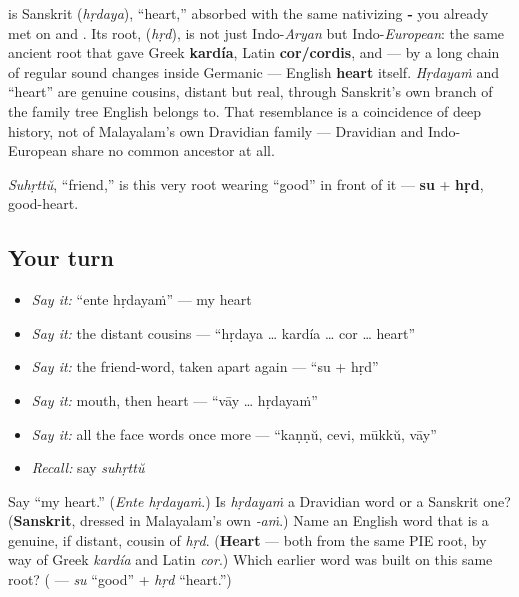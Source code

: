 \begin{cousinweb}
\textbf{} is Sanskrit \textbf{} (\emph{hṛdaya}), \textquotedblleft{}heart,\textquotedblright{} absorbed with the same nativizing \textbf{‑} you already met on \textbf{} and \textbf{}. Its root, \textbf{} (\emph{hṛd}), is not just Indo-\emph{Aryan} but Indo-\emph{European}: the same ancient root that gave Greek \textbf{kardía}, Latin \textbf{cor/cordis}, and — by a long chain of regular sound changes inside Germanic — English \textbf{heart} itself. \emph{Hṛdayaṁ} and \textquotedblleft{}heart\textquotedblright{} are genuine cousins, distant but real, through Sanskrit's own branch of the family tree English belongs to. That resemblance is a coincidence of deep history, not of Malayalam's own Dravidian family — Dravidian and Indo-European share no common ancestor at all.

\emph{Suhṛttŭ}, \textquotedblleft{}friend,\textquotedblright{} is this very root wearing \textquotedblleft{}good\textquotedblright{} in front of it — \textbf{su} + \textbf{hṛd}, good-heart.
\end{cousinweb}

\subsection*{Your turn}
\begin{itemize}
\raggedright
  \item \emph{Say it:} \textquotedblleft{}ente hṛdayaṁ\textquotedblright{} — my heart
  \item \emph{Say it:} the distant cousins — \textquotedblleft{}hṛdaya … kardía … cor … heart\textquotedblright{}
  \item \emph{Say it:} the friend-word, taken apart again — \textquotedblleft{}su + hṛd\textquotedblright{}
  \item \emph{Say it:} mouth, then heart — \textquotedblleft{}vāy … hṛdayaṁ\textquotedblright{}
  \item \emph{Say it:} all the face words once more — \textquotedblleft{}kaṇṇŭ, cevi, mūkkŭ, vāy\textquotedblright{}
  \item \emph{Recall:} say \emph{suhṛttŭ}
\end{itemize}

\begin{tcolorbox}[breakable,colback=teal!4,colframe=teal!35!black,title={Before you move on}]
Say \textquotedblleft{}my heart.\textquotedblright{} (\emph{Ente hṛdayaṁ}.) Is \emph{hṛdayaṁ} a Dravidian word or a Sanskrit one? (\textbf{Sanskrit}, dressed in Malayalam's own \emph{‑aṁ}.) Name an English word that is a genuine, if distant, cousin of \emph{hṛd}. (\textbf{Heart} — both from the same PIE root, by way of Greek \emph{kardía} and Latin \emph{cor}.) Which earlier word was built on this same root? (\emph{\textbf{}} — \emph{su} \textquotedblleft{}good\textquotedblright{} + \emph{hṛd} \textquotedblleft{}heart.\textquotedblright{})
\end{tcolorbox}
